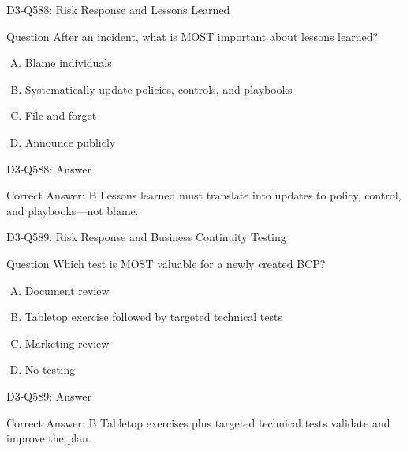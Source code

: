 \documentclass{beamer}
\begin{document}
	\begin{frame}{D3-Q588: Risk Response and Lessons Learned}
		\begin{block}{Question}
			After an incident, what is MOST important about lessons learned?
		\end{block}
		\begin{enumerate}[(A)]
			\item Blame individuals
			\item Systematically update policies, controls, and playbooks
			\item File and forget
			\item Announce publicly
		\end{enumerate}
	\end{frame}
	\begin{frame}{D3-Q588: Answer}
		\begin{block}{Correct Answer: B}
			Lessons learned must translate into updates to policy, control, and playbooks—not blame.
		\end{block}
	\end{frame}
	
	\begin{frame}{D3-Q589: Risk Response and Business Continuity Testing}
		\begin{block}{Question}
			Which test is MOST valuable for a newly created BCP?
		\end{block}
		\begin{enumerate}[(A)]
			\item Document review
			\item Tabletop exercise followed by targeted technical tests
			\item Marketing review
			\item No testing
		\end{enumerate}
	\end{frame}
	\begin{frame}{D3-Q589: Answer}
		\begin{block}{Correct Answer: B}
			Tabletop exercises plus targeted technical tests validate and improve the plan.
		\end{block}
	\end{frame}
	
\end{document}
